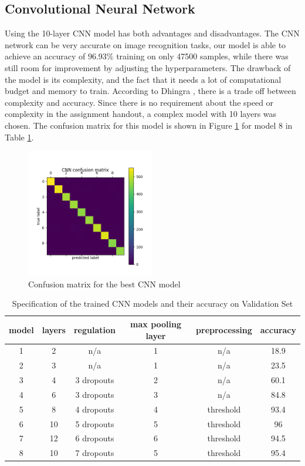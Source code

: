 \documentclass[letterpaper, 10 pt, conference]{ieeeconf}  %
\begin{document}
\subsection{Convolutional Neural Network}
Using the 10-layer CNN model has both advantages and disadvantages. The CNN network can be very accurate on image recognition tasks, our model is able to achieve an accuracy of 96.93\% training on only 47500 samples, while there was still room for improvement by adjusting the hyperparameters. The drawback of the model is its complexity, and the fact that it needs a lot of computational budget and memory to train. According to Dhingra \cite{dhingra2017model}, there is a trade off between complexity and accuracy. Since there is no requirement about the speed or complexity in the assignment handout, a complex model with 10 layers was chosen. The confusion matrix for this model is shown in Figure \ref{fig:cnnconf} for model 8 in Table \ref{tab:CNNmodels}.
\begin{figure}
	\begin{center}
			\includegraphics[width=0.5\textwidth]{figures/cnn_conf.png}  %
		\caption{Confusion matrix for the best CNN model}
		\label{fig:cnnconf}
	\end{center}
\end{figure}


\begin{table}[t]
	\centering
	\caption{Specification of the trained CNN models and their accuracy on Validation Set}
	\label{tab:CNNmodels}
	\begin{tabular}{|c|c|c|c|c|c|}
		\hline
		model	&layers&	regulation&	max pooling layer&preprocessing&accuracy\\\hline
		1&	2& n/a & 1   &	n/a		&18.9\\\hline	
		2&	3&	n/a		&1  &	n/a		&23.5\\\hline
		3&	4&	3 dropouts&2&	n/a		&60.1\\\hline
		4&	6&	3 dropouts&3&	n/a		& 84.8	\\\hline
		5&	8&	4 dropouts&4&threshold&93.4	\\\hline
		6&	10&	5 dropouts&5&threshold &96\\\hline
		7&	12&	6 dropouts&6&threshold&94.5\\\hline	
		8&	10&	7 dropouts&5&threshold&95.4\\\hline			
	\end{tabular}
\end{table}
\end{document}
